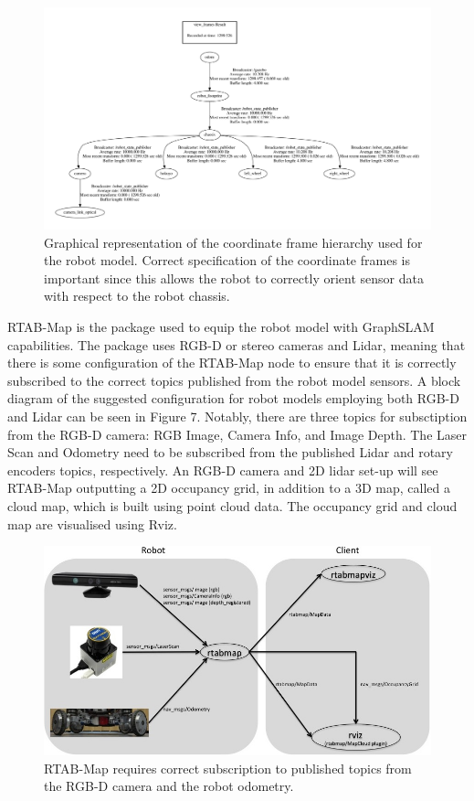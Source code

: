 \documentclass[a4paper]{article}
\begin{document}
\clearpage

\begin{figure}
	\centering
	\includegraphics[scale=0.5]{frames}
	\caption{Graphical representation of the coordinate frame hierarchy used for the robot model. Correct specification of the coordinate frames is important since this allows the robot to correctly orient sensor data with respect to the robot chassis.}
\end{figure}

\clearpage

RTAB-Map is the package used to equip the robot model with GraphSLAM capabilities. The package uses RGB-D or stereo cameras and Lidar, meaning that there is some configuration of the RTAB-Map node to ensure that it is correctly subscribed to the correct topics published from the robot model sensors. A block diagram of the suggested configuration for robot models employing both RGB-D and Lidar can be seen in Figure 7. Notably, there are three topics for subsctiption from the RGB-D camera: RGB Image, Camera Info, and Image Depth. The Laser Scan and Odometry need to be subscribed from the published Lidar and rotary encoders topics, respectively. An RGB-D camera and 2D lidar set-up will see RTAB-Map outputting a 2D occupancy grid, in addition to a 3D map, called a cloud map, which is built using point cloud data. The occupancy grid and cloud map are visualised using Rviz.\\

\begin{figure}[h]
	\centering
	\includegraphics[scale=0.5]{rtabmap_setup}
	\caption{RTAB-Map requires correct subscription to published topics from the RGB-D camera and the robot odometry.}
\end{figure}
\end{document}
